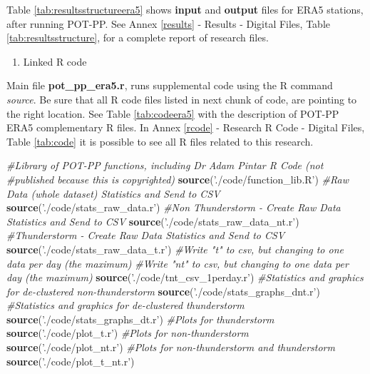 \documentclass[12pt,oneside]{reedthesis}
\newenvironment{Shaded}{\begin{snugshade}}{\end{snugshade}}
\newcommand{\CommentTok}[1]{\textcolor[rgb]{0.56,0.35,0.01}{\textit{#1}}}
\newcommand{\KeywordTok}[1]{\textcolor[rgb]{0.13,0.29,0.53}{\textbf{#1}}}
\newcommand{\NormalTok}[1]{#1}
\newcommand{\StringTok}[1]{\textcolor[rgb]{0.31,0.60,0.02}{#1}}
\providecommand{\tightlist}{%
  \setlength{\itemsep}{0pt}\setlength{\parskip}{0pt}}
\begin{document}
Table \ref{tab:resultsstructureera5} shows \textbf{input} and \textbf{output} files for ERA5 stations, after running POT-PP. See Annex \ref{results} - Results - Digital Files, Table \ref{tab:resultsstructure}, for a complete report of research files.
\begin{enumerate}
\def\labelenumi{\arabic{enumi}.}
\setcounter{enumi}{2}
\tightlist
\item
  Linked R code
\end{enumerate}
Main file \textbf{pot\_pp\_era5.r}, runs supplemental code using the R command \emph{source}. Be sure that all R code files listed in next chunk of code, are pointing to the right location. See Table \ref{tab:codeera5} with the description of POT-PP ERA5 complementary R files. In Annex \ref{rcode} - Research R Code - Digital Files, Table \ref{tab:code} it is possible to see all R files related to this research.

\scriptsize

\vspace{0.4cm}
\begin{Shaded}
\begin{Highlighting}[]
    \CommentTok{#Library of POT-PP functions, including Dr Adam Pintar R Code (not }
    \CommentTok{#published because this is copyrighted)}
      \KeywordTok{source}\NormalTok{(}\StringTok{'./code/function_lib.R'}\NormalTok{)}
    \CommentTok{#Raw Data (whole dataset) Statistics and Send to CSV }
      \KeywordTok{source}\NormalTok{(}\StringTok{'./code/stats_raw_data.r'}\NormalTok{)}
    \CommentTok{#Non Thunderstorm - Create Raw Data Statistics and Send to CSV }
      \KeywordTok{source}\NormalTok{(}\StringTok{'./code/stats_raw_data_nt.r'}\NormalTok{)}
    \CommentTok{#Thunderstorm - Create Raw Data Statistics and Send to CSV}
      \KeywordTok{source}\NormalTok{(}\StringTok{'./code/stats_raw_data_t.r'}\NormalTok{)}
    \CommentTok{#Write "t" to csv, but changing to one data per day (the maximum)}
    \CommentTok{#Write "nt" to csv, but changing to one data per day (the maximum)}
      \KeywordTok{source}\NormalTok{(}\StringTok{'./code/tnt_csv_1perday.r'}\NormalTok{)}
    \CommentTok{#Statistics and graphics for de-clustered non-thunderstorm}
      \KeywordTok{source}\NormalTok{(}\StringTok{'./code/stats_graphs_dnt.r'}\NormalTok{)}
    \CommentTok{#Statistics and graphics for de-clustered thunderstorm}
      \KeywordTok{source}\NormalTok{(}\StringTok{'./code/stats_graphs_dt.r'}\NormalTok{)}
    \CommentTok{#Plots for thunderstorm}
      \KeywordTok{source}\NormalTok{(}\StringTok{'./code/plot_t.r'}\NormalTok{)}
    \CommentTok{#Plots for non-thunderstorm}
      \KeywordTok{source}\NormalTok{(}\StringTok{'./code/plot_nt.r'}\NormalTok{)}
    \CommentTok{#Plots for non-thunderstorm and thunderstorm}
      \KeywordTok{source}\NormalTok{(}\StringTok{'./code/plot_t_nt.r'}\NormalTok{)}
\end{Highlighting}
\end{Shaded}
\normalsize
\end{document}
